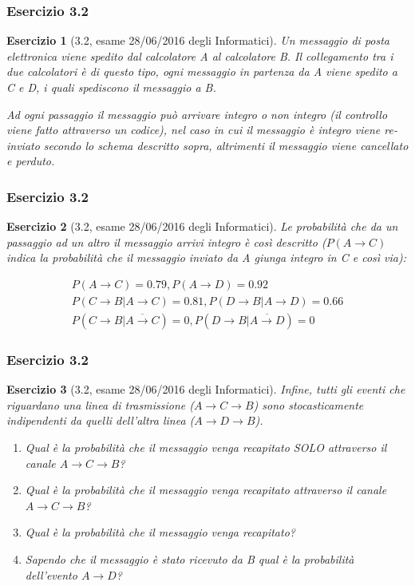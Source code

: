 \documentclass{beamer}
\newtheorem{exercise}{Esercizio}
\begin{document}
\begin{frame}[fragile]
	\frametitle{Esercizio 3.2}
	\begin{exercise}[3.2, esame 28/06/2016 degli Informatici]
		Un messaggio di posta elettronica viene spedito dal calcolatore A al calcolatore B. Il collegamento tra i due calcolatori è di questo tipo, ogni messaggio in partenza da A viene spedito a C e D, i quali spediscono il messaggio a B.

		Ad ogni passaggio il messaggio può arrivare integro o non integro (il controllo viene fatto attraverso un codice), nel caso in cui il messaggio è integro viene re-inviato secondo lo schema descritto sopra, altrimenti il messaggio viene cancellato e perduto.
	\end{exercise}
\end{frame}

\begin{frame}[fragile]
	\frametitle{Esercizio 3.2}
	\begin{exercise}[3.2, esame 28/06/2016 degli Informatici]
		Le probabilità che da un passaggio ad un altro il messaggio arrivi integro è così descritto ($P(A \rightarrow C)$ indica la probabilità che il messaggio inviato da A giunga integro in C e così via):

		\begin{gather*}
			P(A \rightarrow C) = 0.79, P(A \rightarrow D) = 0.92 \\
			P(C \rightarrow B|A \rightarrow C) = 0.81, P(D \rightarrow B|A \rightarrow D) = 0.66 \\
			P(C \rightarrow B|\overline{A \rightarrow C}) = 0, P(D \rightarrow B|\overline{A \rightarrow D}) = 0
		\end{gather*}
	\end{exercise}
\end{frame}

\begin{frame}[fragile]
	\frametitle{Esercizio 3.2}
	\begin{exercise}[3.2, esame 28/06/2016 degli Informatici]
		Infine, tutti gli eventi che riguardano una linea di trasmissione ($A \rightarrow C \rightarrow B$) sono stocasticamente indipendenti da quelli dell'altra linea ($A \rightarrow D \rightarrow B$).
		\begin{enumerate}
			\item Qual è la probabilità che il messaggio venga recapitato SOLO attraverso il canale $A \rightarrow C \rightarrow B$?
			\item Qual è la probabilità che il messaggio venga recapitato attraverso il canale $A \rightarrow C \rightarrow B$?
			\item Qual è la probabilità che il messaggio venga recapitato?
			\item Sapendo che il messaggio è stato ricevuto da B qual è la probabilità dell'evento $A \rightarrow D$?
		\end{enumerate}
	\end{exercise}
\end{frame}
\end{document}
